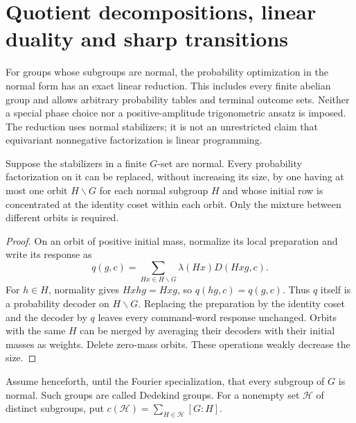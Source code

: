\section{Quotient decompositions, linear duality and sharp transitions}
\label{sec:r74-quotient-memory}

For groups whose subgroups are normal, the probability optimization in the
normal form has an exact linear reduction. This includes every finite abelian
group and allows arbitrary probability tables and terminal outcome sets.
Neither a special phase choice nor a positive-amplitude trigonometric ansatz
is imposed. The reduction uses normal stabilizers; it is not an unrestricted
claim that equivariant nonnegative factorization is linear programming.

\begin{lemma}
\label{lem:r74-normal-orbits}
Suppose the stabilizers in a finite $G$-set are normal. Every probability
factorization on it can be replaced, without increasing its size, by one
having at most one orbit $H\backslash G$ for each normal subgroup $H$ and
whose initial row is concentrated at the identity coset within each orbit.
Only the mixture between different orbits is required.
\end{lemma}
\begin{proof}
On an orbit of positive initial mass, normalize its local preparation and
write its response as
\[
 q(g,c)=\sum_{Hx\in H\backslash G}\lambda(Hx)D(Hxg,c).
\]
For $h\in H$, normality gives $Hxhg=Hxg$, so $q(hg,c)=q(g,c)$.
Thus $q$ itself is a probability decoder on $H\backslash G$. Replacing
the preparation by the identity coset and the decoder by $q$ leaves every
command-word response unchanged. Orbits with the same $H$ can be merged
by averaging their decoders with their initial masses as weights.
Delete zero-mass orbits. These operations weakly decrease the size.
\end{proof}

Assume henceforth, until the Fourier specialization, that every subgroup of
$G$ is normal. Such groups are called Dedekind groups. For a nonempty set
$\mathcal H$ of distinct subgroups, put
$c(\mathcal H)=\sum_{H\in\mathcal H}[G:H]$.

